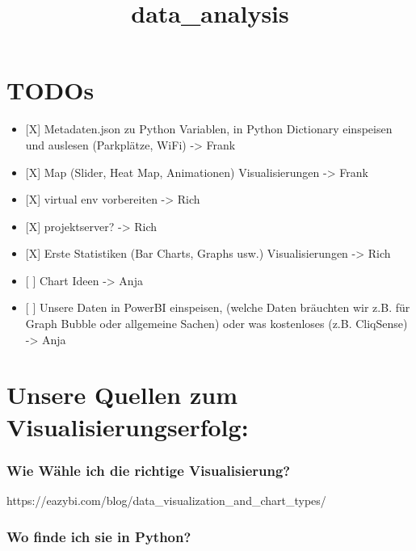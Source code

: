 \documentclass[11pt]{article}
\title{data\_analysis}
\providecommand{\tightlist}{%
      \setlength{\itemsep}{0pt}\setlength{\parskip}{0pt}}
\begin{document}
    
    
    \maketitle
    
    

    
    \section{TODOs}\label{todos}

\begin{itemize}
\tightlist
\item
  {[}X{]} Metadaten.json zu Python Variablen, in Python Dictionary
  einspeisen und auslesen (Parkplätze, WiFi) -\textgreater{} Frank
\item
  {[}X{]} Map (Slider, Heat Map, Animationen) Visualisierungen
  -\textgreater{} Frank
\item
  {[}X{]} virtual env vorbereiten -\textgreater{} Rich
\item
  {[}X{]} projektserver? -\textgreater{} Rich
\item
  {[}X{]} Erste Statistiken (Bar Charts, Graphs usw.) Visualisierungen
  -\textgreater{} Rich
\item
  {[} {]} Chart Ideen -\textgreater{} Anja
\item
  {[} {]} Unsere Daten in PowerBI einspeisen, (welche Daten bräuchten
  wir z.B. für Graph Bubble oder allgemeine Sachen) oder was kostenloses
  (z.B. CliqSense) -\textgreater{} Anja
\end{itemize}

    \section{Unsere Quellen zum
Visualisierungserfolg:}\label{unsere-quellen-zum-visualisierungserfolg}

\subsubsection{Wie Wähle ich die richtige
Visualisierung?}\label{wie-wuxe4hle-ich-die-richtige-visualisierung}

https://eazybi.com/blog/data\_visualization\_and\_chart\_types/

\subsubsection{Wo finde ich sie in
Python?}\label{wo-finde-ich-sie-in-python}
\end{document}
